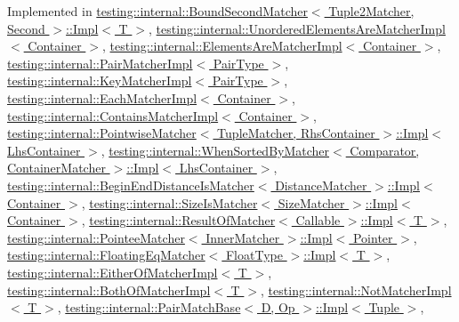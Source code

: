 Implemented in \hyperlink{classtesting_1_1internal_1_1BoundSecondMatcher_1_1Impl_ae56a4b11434e351d640aceaf82c78be1}{testing\+::internal\+::\+Bound\+Second\+Matcher$<$ Tuple2\+Matcher, Second $>$\+::\+Impl$<$ T $>$}, \hyperlink{classtesting_1_1internal_1_1UnorderedElementsAreMatcherImpl_a4031291eef9be8c1e9e1effdd02c4334}{testing\+::internal\+::\+Unordered\+Elements\+Are\+Matcher\+Impl$<$ Container $>$}, \hyperlink{classtesting_1_1internal_1_1ElementsAreMatcherImpl_a6562159fa83e09417c3552fd881f878e}{testing\+::internal\+::\+Elements\+Are\+Matcher\+Impl$<$ Container $>$}, \hyperlink{classtesting_1_1internal_1_1PairMatcherImpl_a1bba47f97cbf50a1f6331d3f7bfd47a1}{testing\+::internal\+::\+Pair\+Matcher\+Impl$<$ Pair\+Type $>$}, \hyperlink{classtesting_1_1internal_1_1KeyMatcherImpl_ae821c96473c6400defbb21eb9eca8d4c}{testing\+::internal\+::\+Key\+Matcher\+Impl$<$ Pair\+Type $>$}, \hyperlink{classtesting_1_1internal_1_1EachMatcherImpl_a3b8ca89c85a96bbbcc74196ad29bf1ec}{testing\+::internal\+::\+Each\+Matcher\+Impl$<$ Container $>$}, \hyperlink{classtesting_1_1internal_1_1ContainsMatcherImpl_a1cb9f1d2da48bd4a48c281215f8f94e9}{testing\+::internal\+::\+Contains\+Matcher\+Impl$<$ Container $>$}, \hyperlink{classtesting_1_1internal_1_1PointwiseMatcher_1_1Impl_a4253946989f3743c4dd983909f2d062b}{testing\+::internal\+::\+Pointwise\+Matcher$<$ Tuple\+Matcher, Rhs\+Container $>$\+::\+Impl$<$ Lhs\+Container $>$}, \hyperlink{classtesting_1_1internal_1_1WhenSortedByMatcher_1_1Impl_a9d8f57c729df8c041f2fd7febbc950da}{testing\+::internal\+::\+When\+Sorted\+By\+Matcher$<$ Comparator, Container\+Matcher $>$\+::\+Impl$<$ Lhs\+Container $>$}, \hyperlink{classtesting_1_1internal_1_1BeginEndDistanceIsMatcher_1_1Impl_aa7bda59eae256018247699b0baa285c9}{testing\+::internal\+::\+Begin\+End\+Distance\+Is\+Matcher$<$ Distance\+Matcher $>$\+::\+Impl$<$ Container $>$}, \hyperlink{classtesting_1_1internal_1_1SizeIsMatcher_1_1Impl_a5180472f5a18b8c0314ed835c52e09d4}{testing\+::internal\+::\+Size\+Is\+Matcher$<$ Size\+Matcher $>$\+::\+Impl$<$ Container $>$}, \hyperlink{classtesting_1_1internal_1_1ResultOfMatcher_1_1Impl_a4f9d7dfdad8ad8f1ab4f5ffe11c26763}{testing\+::internal\+::\+Result\+Of\+Matcher$<$ Callable $>$\+::\+Impl$<$ T $>$}, \hyperlink{classtesting_1_1internal_1_1PointeeMatcher_1_1Impl_a2aeaf0b7284fb2c7a7745746ec6ce63b}{testing\+::internal\+::\+Pointee\+Matcher$<$ Inner\+Matcher $>$\+::\+Impl$<$ Pointer $>$}, \hyperlink{classtesting_1_1internal_1_1FloatingEqMatcher_1_1Impl_a4ce47c481fdc4973ed671a492f455f99}{testing\+::internal\+::\+Floating\+Eq\+Matcher$<$ Float\+Type $>$\+::\+Impl$<$ T $>$}, \hyperlink{classtesting_1_1internal_1_1EitherOfMatcherImpl_af00ed8cd85c36f1e862bf85f776cee3b}{testing\+::internal\+::\+Either\+Of\+Matcher\+Impl$<$ T $>$}, \hyperlink{classtesting_1_1internal_1_1BothOfMatcherImpl_a4f3e5edf69d168fef8bec577313748f4}{testing\+::internal\+::\+Both\+Of\+Matcher\+Impl$<$ T $>$}, \hyperlink{classtesting_1_1internal_1_1NotMatcherImpl_aff3743d9ffcd6dc54b389b5e23caacf3}{testing\+::internal\+::\+Not\+Matcher\+Impl$<$ T $>$}, \hyperlink{classtesting_1_1internal_1_1PairMatchBase_1_1Impl_abba39c0ceaf795ded3845af76af8772f}{testing\+::internal\+::\+Pair\+Match\+Base$<$ D, Op $>$\+::\+Impl$<$ Tuple $>$}, 